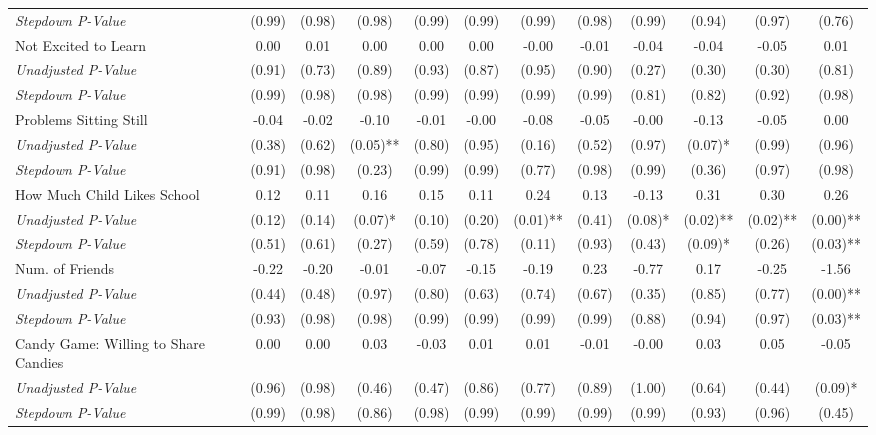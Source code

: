\begin{tabular}{l c c c c c c c c c c c}
\quad \textit{Stepdown P-Value} & (0.99) & (0.98) & (0.98) & (0.99) & (0.99) & (0.99) & (0.98) & (0.99) & (0.94) & (0.97) & (0.76) \\
Not Excited to Learn & 0.00 & 0.01 & 0.00 & 0.00 & 0.00 & -0.00 & -0.01 & -0.04 & -0.04 & -0.05 & 0.01 \\
\quad \textit{Unadjusted P-Value} & (0.91) & (0.73) & (0.89) & (0.93) & (0.87) & (0.95) & (0.90) & (0.27) & (0.30) & (0.30) & (0.81) \\
\quad \textit{Stepdown P-Value} & (0.99) & (0.98) & (0.98) & (0.99) & (0.99) & (0.99) & (0.99) & (0.81) & (0.82) & (0.92) & (0.98) \\
Problems Sitting Still & -0.04 & -0.02 & -0.10 & -0.01 & -0.00 & -0.08 & -0.05 & -0.00 & -0.13 & -0.05 & 0.00 \\
\quad \textit{Unadjusted P-Value} & (0.38) & (0.62) & (0.05)** & (0.80) & (0.95) & (0.16) & (0.52) & (0.97) & (0.07)* & (0.99) & (0.96) \\
\quad \textit{Stepdown P-Value} & (0.91) & (0.98) & (0.23) & (0.99) & (0.99) & (0.77) & (0.98) & (0.99) & (0.36) & (0.97) & (0.98) \\
How Much Child Likes School & 0.12 & 0.11 & 0.16 & 0.15 & 0.11 & 0.24 & 0.13 & -0.13 & 0.31 & 0.30 & 0.26 \\
\quad \textit{Unadjusted P-Value} & (0.12) & (0.14) & (0.07)* & (0.10) & (0.20) & (0.01)** & (0.41) & (0.08)* & (0.02)** & (0.02)** & (0.00)** \\
\quad \textit{Stepdown P-Value} & (0.51) & (0.61) & (0.27) & (0.59) & (0.78) & (0.11) & (0.93) & (0.43) & (0.09)* & (0.26) & (0.03)** \\
Num. of Friends & -0.22 & -0.20 & -0.01 & -0.07 & -0.15 & -0.19 & 0.23 & -0.77 & 0.17 & -0.25 & -1.56 \\
\quad \textit{Unadjusted P-Value} & (0.44) & (0.48) & (0.97) & (0.80) & (0.63) & (0.74) & (0.67) & (0.35) & (0.85) & (0.77) & (0.00)** \\
\quad \textit{Stepdown P-Value} & (0.93) & (0.98) & (0.98) & (0.99) & (0.99) & (0.99) & (0.99) & (0.88) & (0.94) & (0.97) & (0.03)** \\
Candy Game: Willing to Share Candies & 0.00 & 0.00 & 0.03 & -0.03 & 0.01 & 0.01 & -0.01 & -0.00 & 0.03 & 0.05 & -0.05 \\
\quad \textit{Unadjusted P-Value} & (0.96) & (0.98) & (0.46) & (0.47) & (0.86) & (0.77) & (0.89) & (1.00) & (0.64) & (0.44) & (0.09)* \\
\quad \textit{Stepdown P-Value} & (0.99) & (0.98) & (0.86) & (0.98) & (0.99) & (0.99) & (0.99) & (0.99) & (0.93) & (0.96) & (0.45) \\
\bottomrule
\end{tabular}
